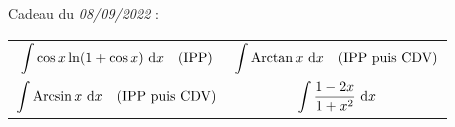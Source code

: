 


























































\vfill
Cadeau du {\it 08/09/2022}\/ :
\begin{center}
	\begin{tabular}{cc}
		$\displaystyle \int \cos x \ln(1+\cos x)~\mathrm{d}x \quad \text{(IPP)}$&
		$\displaystyle \int \operatorname{Arctan} x~\mathrm{d}x\quad\text{(IPP puis CDV)}$\\
		$\displaystyle \int \operatorname{Arcsin} x~\mathrm{d}x\quad\text{(IPP puis CDV)}$&
		$\displaystyle \int \frac{1-2x}{1+x^2}~\mathrm{d}x$\\
	\end{tabular}
\end{center}
\eject


